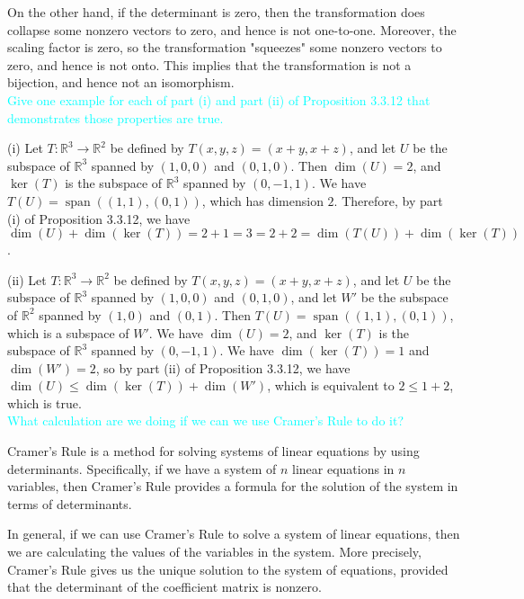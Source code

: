 \documentclass[fontsize=12pt]{scrartcl}
\begin{document}
\noindent
On the other hand, if the determinant is zero, then the transformation does collapse some nonzero vectors to zero, and hence is not one-to-one. Moreover, the scaling factor is zero, so the transformation "squeezes" some nonzero vectors to zero, and hence is not onto. This implies that the transformation is not a bijection, and hence not an isomorphism.
\\

\noindent
\textcolor{cyan}{Give one example for each of part (i) and part (ii) of Proposition 3.3.12 that demonstrates those properties are true.}

\noindent
(i) Let $T: \mathbb{R}^3 \rightarrow \mathbb{R}^2$ be defined by $T(x,y,z) = (x+y, x+z)$, and let $U$ be the subspace of $\mathbb{R}^3$ spanned by $(1,0,0)$ and $(0,1,0)$. Then $\dim(U) = 2$, and $\operatorname{ker}(T)$ is the subspace of $\mathbb{R}^3$ spanned by $(0,-1,1)$. We have $T(U) = \operatorname{span}((1,1),(0,1))$, which has dimension $2$. Therefore, by part (i) of Proposition 3.3.12, we have $\dim(U) + \dim(\operatorname{ker}(T)) = 2 + 1 = 3 = 2 + 2 = \dim(T(U)) + \dim(\operatorname{ker}(T))$.

\noindent
(ii) Let $T: \mathbb{R}^3 \rightarrow \mathbb{R}^2$ be defined by $T(x,y,z) = (x+y, x+z)$, and let $U$ be the subspace of $\mathbb{R}^3$ spanned by $(1,0,0)$ and $(0,1,0)$, and let $W'$ be the subspace of $\mathbb{R}^2$ spanned by $(1,0)$ and $(0,1)$. Then $T(U) = \operatorname{span}((1,1),(0,1))$, which is a subspace of $W'$. We have $\dim(U) = 2$, and $\operatorname{ker}(T)$ is the subspace of $\mathbb{R}^3$ spanned by $(0,-1,1)$. We have $\dim(\operatorname{ker}(T)) = 1$ and $\dim(W') = 2$, so by part (ii) of Proposition 3.3.12, we have $\dim(U) \leq \dim(\operatorname{ker}(T)) + \dim(W')$, which is equivalent to $2 \leq 1 + 2$, which is true.
\\

\noindent
\textcolor{cyan}{What calculation are we doing if we can we use Cramer's Rule to do it?}

\noindent
Cramer's Rule is a method for solving systems of linear equations by using determinants. Specifically, if we have a system of $n$ linear equations in $n$ variables, then Cramer's Rule provides a formula for the solution of the system in terms of determinants.

\noindent
In general, if we can use Cramer's Rule to solve a system of linear equations, then we are calculating the values of the variables in the system. More precisely, Cramer's Rule gives us the unique solution to the system of equations, provided that the determinant of the coefficient matrix is nonzero.
\end{document}

